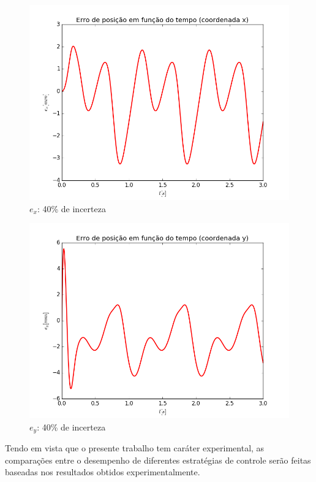 \documentclass[]{politex}
\begin{document}
\begin{multicols}{2}
\begin{figure}[H]
	\centering
	\includegraphics[scale=0.42]{imagens/ex_40.png}  
	\caption{$e_x$: 40\% de incerteza}
	\label{fig:ex_40}
\end{figure}
\begin{figure}[H]
	\centering
	\includegraphics[scale=0.42]{imagens/ey_40.png}  
	\caption{$e_y$: 40\% de incerteza}
	\label{fig:ey_40}
\end{figure}
\end{multicols}

\newpage

Tendo em vista que o presente trabalho tem caráter experimental, as comparações entre o desempenho de diferentes estratégias de controle serão feitas baseadas nos resultados obtidos experimentalmente.
\end{document}
